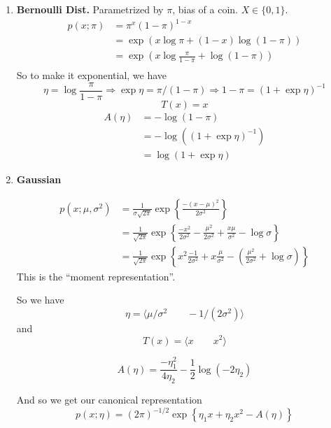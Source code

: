 \documentclass{article}
\newcommand{\inv}{^{-1}}
\begin{document}
\begin{enumerate}
	\item
	\textbf{Bernoulli Dist.}
	Parametrized by $\pi$, bias of a coin. $X\in\{0,1\}$.
	\begin{align}
	p(x;\pi) &= \pi^x (1-\pi)^{1-x} \\
	&= \exp ( x \log \pi + (1-x) \log (1-\pi)) 
	\\
	&= \exp  \left( x \log \frac{\pi}{1-\pi} + \log (1-\pi) \right) 
	\\
	\end{align}
	So to make it exponential, we have
	$$
	\eta = \log \frac{\pi}{1 - \pi}
	\Rightarrow
	\exp\eta = \pi / (1 - \pi)
	\Rightarrow
	1 - \pi = (1 + \exp\eta)\inv
	$$
	$$
	T(x) = x
	$$
	\begin{align*}
	A(\eta) &= - \log(1 - \pi)
	\\
	&= -\log((1 + \exp \eta)\inv)
	\\
	&= \log(1 + \exp \eta)
	\end{align*}
	
	
	
	\item
	\textbf{Gaussian}
	
	
	\begin{align}
	p(x;\mu,\sigma^2) &= 
	\frac{1}{\sigma\sqrt{2\pi}} \exp\left\{  \frac{-(x-\mu)^2}{2\sigma^2}   \right\}
	\\
	&= 
	\frac{1}{\sqrt{2\pi}} \exp\left\{  
		\frac{-x^2}{2\sigma^2}
		-
		\frac{\mu^2}{2\sigma^2}
		+
		\frac{x\mu}{\sigma^2}
		-\log\sigma
	\right\}
	\\
	&= 
	\frac{1}{\sqrt{2\pi}} \exp\left\{  
		x^2\frac{-1}{2\sigma^2}
		+
		x
		\frac{\mu}{\sigma^2}
		-
		\left(
		\frac{\mu^2}{2\sigma^2}
		+\log\sigma
		\right)
	\right\}
	\end{align}
	This is the ``moment representation''.
	
	So we have
	$$
	\eta = \langle
	\mu/\sigma^2
	\qquad
	-1/(2\sigma^2)
	 \rangle
	$$
	and
	$$
	T(x) = \langle   x\qquad x^2   \rangle
	$$
	
	$$
	A(\eta) = 
	\frac{-\eta_1^2}
	{4\eta_2}
	-
	\frac{1}{2} \log(-2\eta_2)
	$$

	And so we get our canonical representation
	$$
	p(x;\eta) = (2\pi)^{-1/2} \exp\left\{   \eta_1 x + \eta_2 x^2  - A(\eta)  \right\}
	$$
	

\end{enumerate}
\end{document}
